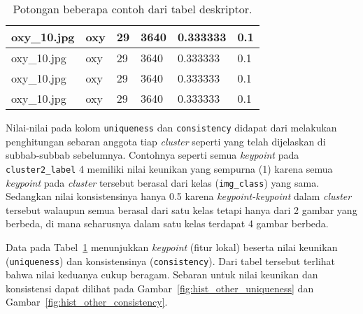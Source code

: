 \begin{table}[H]
\begin{tabular}{|l|l|l|l|l|l|}
		oxy\_10.jpg                        & oxy                                      & 29                                           & 3640                                         & 0.333333                                 & 0.1                                       \\ \hline
		oxy\_10.jpg                        & oxy                                      & 29                                           & 3640                                         & 0.333333                                 & 0.1                                       \\ \hline
		oxy\_10.jpg                        & oxy                                      & 29                                           & 3640                                         & 0.333333                                 & 0.1                                       \\ \hline
		oxy\_10.jpg                        & oxy                                      & 29                                           & 3640                                         & 0.333333                                 & 0.1                                       \\ \hline
	\end{tabular}
	\caption{Potongan beberapa contoh dari tabel deskriptor.}
	\label{tab:descriptors_table}
\end{table}

Nilai-nilai pada kolom \texttt{uniqueness} dan \texttt{consistency} didapat dari melakukan penghitungan sebaran anggota tiap \textit{cluster} seperti yang telah dijelaskan di subbab-subbab sebelumnya. Contohnya seperti semua \textit{keypoint} pada \texttt{cluster2\_label} 4 memiliki nilai keunikan yang sempurna (1) karena semua \textit{keypoint} pada \textit{cluster} tersebut berasal dari kelas (\texttt{img\_class}) yang sama. Sedangkan nilai konsistensinya hanya 0.5 karena \textit{keypoint-keypoint} dalam \textit{cluster} tersebut walaupun semua berasal dari satu kelas tetapi hanya dari 2 gambar yang berbeda, di mana seharusnya dalam satu kelas terdapat 4 gambar berbeda.

Data pada Tabel~\ref{tab:descriptors_table} menunjukkan \textit{keypoint} (fitur lokal) beserta nilai keunikan (\texttt{uniqueness}) dan konsistensinya (\texttt{consistency}). Dari tabel tersebut terlihat bahwa nilai keduanya cukup beragam. Sebaran untuk nilai keunikan dan konsistensi dapat dilihat pada Gambar~\ref{fig:hist_other_uniqueness} dan Gambar~\ref{fig:hist_other_consistency}.

